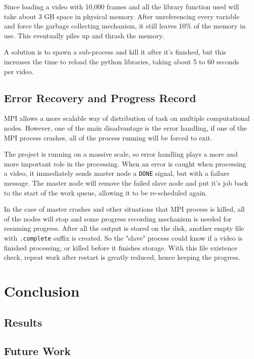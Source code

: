 \documentclass[bsc,logo,twoside,fullspacing,parskip]{infthesis}
\begin{document}
Since loading a video with 10,000 frames and all the library function used will take about 3 GB space in physical memory. 
After unreferencing every variable and force the garbage collecting mechanism, it still leaves 10\% of the memory in use. This eventually piles up and thrash the memory. 

A solution is to spawn a sub-process and kill it after it's finished, but this increases the time to reload the python libraries, taking about 5 to 60 seconds per video.

\section{Error Recovery and Progress Record}

MPI allows a more scalable way of distribution of task on multiple computational nodes.
However, one of the main disadvantage is the error handling, if one of the MPI process crashes, all of the process running will be forced to exit.

The project is running on a massive scale, so error handling plays a more and more important role in the processing. 
When an error is caught when processing a video, it immediately sends master node a {\tt DONE} signal, but with a failure message. The master node will remove the failed slave node and put it's job back to the start of the work queue, allowing it to be re-scheduled again.

In the case of master crashes and other situations that MPI process is killed, all of the nodes will stop and some progress recording mechanism is needed for resuming progress. After all the output is stored on the disk, another empty file with {\tt .complete} suffix is created. So the "slave" process could know if a video is finished processing, or killed before it finishes storage. With this file existence check, repeat work after restart is greatly reduced, hence keeping the progress.

\newpage

\chapter{Conclusion}
\section{Results}
\section{Future Work}
\end{document}
